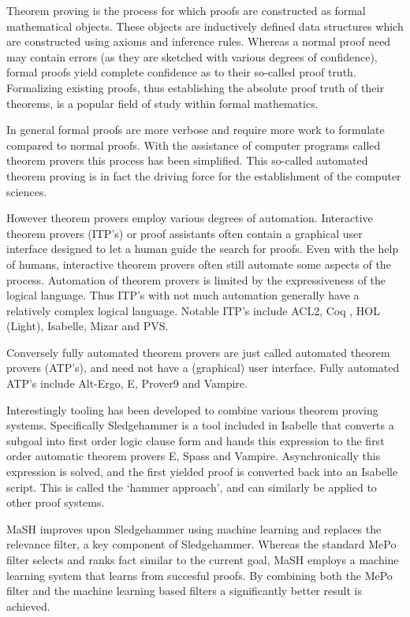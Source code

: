 Theorem proving is the process for which proofs are constructed as formal mathematical objects.
These objects are inductively defined data structures which are constructed using axioms and inference rules.
Whereas a normal proof need may contain errors (as they are sketched with various degrees of confidence),
formal proofs yield complete confidence as to their so-called proof truth.
Formalizing existing proofs, thus establishing the absolute proof truth of their theorems, is a popular field of study within formal mathematics.

In general formal proofs are more verbose and require more work to formulate compared to normal proofs.
With the assistance of computer programs called theorem provers this process has been simplified.
This so-called automated theorem proving is in fact the driving force for the establishment of the computer sciences.

However theorem provers employ various degrees of automation.
Interactive theorem provers (ITP's) or proof assistants often contain a graphical user interface designed to let a human guide the search for proofs.
Even with the help of humans, interactive theorem provers often still automate some aspects of the process.
Automation of theorem provers is limited by the expressiveness of the logical language.
Thus ITP's with not much automation generally have a relatively complex logical language.
Notable ITP's include ACL2, Coq \cite{bertot2013interactive}, HOL (Light), Isabelle, Mizar and PVS.

Conversely fully automated theorem provers are just called automated theorem provers (ATP's), and need not have a (graphical) user interface.
Fully automated ATP's include Alt-Ergo, E, Prover9 and Vampire.

Interestingly tooling has been developed to combine various theorem proving systems.
Specifically Sledgehammer \cite{meng2006automation} is a tool included in Isabelle that converts a subgoal into first order logic clause form and
hands this expression to the first order automatic theorem provers E, Spass and Vampire.
Asynchronically this expression is solved, and the first yielded proof is converted back into an Isabelle script.
This is called the `hammer approach', and can similarly be applied to other proof systems.

MaSH \cite{kuhlwein2013mash} improves upon Sledgehammer using machine learning and replaces the relevance filter, a key component of Sledgehammer.
Whereas the standard MePo filter \cite{meng2009lightweight} selects and ranks fact similar to the current goal,
MaSH employs a machine learning system that learns from succesful proofs.
By combining both the MePo filter and the machine learning based filters a significantly better result is achieved.

